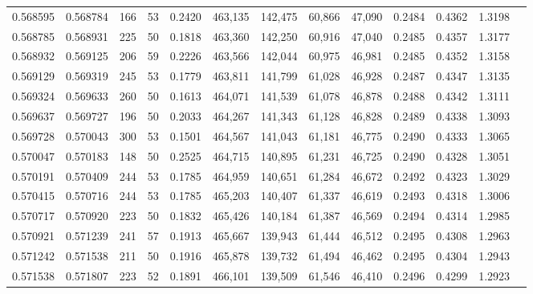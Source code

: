 \begin{tabular}{rrrrrrrrrrrrr}
0.568595 & 0.568784 &   166 &  53 &                                     0.2420 & 463,135 & 142,475 &  60,866 &  47,090 & 0.2484 & 0.4362 & 1.3198 \\
0.568785 & 0.568931 &   225 &  50 &                                     0.1818 & 463,360 & 142,250 &  60,916 &  47,040 & 0.2485 & 0.4357 & 1.3177 \\
0.568932 & 0.569125 &   206 &  59 &                                     0.2226 & 463,566 & 142,044 &  60,975 &  46,981 & 0.2485 & 0.4352 & 1.3158 \\
0.569129 & 0.569319 &   245 &  53 &                                     0.1779 & 463,811 & 141,799 &  61,028 &  46,928 & 0.2487 & 0.4347 & 1.3135 \\
0.569324 & 0.569633 &   260 &  50 &                                     0.1613 & 464,071 & 141,539 &  61,078 &  46,878 & 0.2488 & 0.4342 & 1.3111 \\
0.569637 & 0.569727 &   196 &  50 &                                     0.2033 & 464,267 & 141,343 &  61,128 &  46,828 & 0.2489 & 0.4338 & 1.3093 \\
0.569728 & 0.570043 &   300 &  53 &                                     0.1501 & 464,567 & 141,043 &  61,181 &  46,775 & 0.2490 & 0.4333 & 1.3065 \\
0.570047 & 0.570183 &   148 &  50 &                                     0.2525 & 464,715 & 140,895 &  61,231 &  46,725 & 0.2490 & 0.4328 & 1.3051 \\
0.570191 & 0.570409 &   244 &  53 &                                     0.1785 & 464,959 & 140,651 &  61,284 &  46,672 & 0.2492 & 0.4323 & 1.3029 \\
0.570415 & 0.570716 &   244 &  53 &                                     0.1785 & 465,203 & 140,407 &  61,337 &  46,619 & 0.2493 & 0.4318 & 1.3006 \\
0.570717 & 0.570920 &   223 &  50 &                                     0.1832 & 465,426 & 140,184 &  61,387 &  46,569 & 0.2494 & 0.4314 & 1.2985 \\
0.570921 & 0.571239 &   241 &  57 &                                     0.1913 & 465,667 & 139,943 &  61,444 &  46,512 & 0.2495 & 0.4308 & 1.2963 \\
0.571242 & 0.571538 &   211 &  50 &                                     0.1916 & 465,878 & 139,732 &  61,494 &  46,462 & 0.2495 & 0.4304 & 1.2943 \\
0.571538 & 0.571807 &   223 &  52 &                                     0.1891 & 466,101 & 139,509 &  61,546 &  46,410 & 0.2496 & 0.4299 & 1.2923 \\

\end{tabular}
